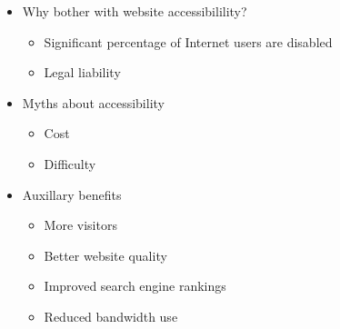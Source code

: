 \documentclass[landscape,20pt]{foils}
\newcommand{\jhead}[1]{\foilhead{\flushleft \textcolor{blue}{\large   #1}
\vspace{-1.9cm} 
\textcolor{blue}{\rule{25cm}{0.5mm}}
}}
\begin{document}
\begin{itemize}

\item Why bother with website accessibilility?

\begin{itemize}

\item Significant percentage of Internet users are disabled

\item Legal liability

\end{itemize}

\item Myths about accessibility

\begin{itemize}

\item Cost

\item Difficulty

\end{itemize}

\item Auxillary benefits

\begin{itemize}

\item More visitors

\item Better website quality

\item Improved search engine rankings

\item Reduced bandwidth use

\end{itemize}

\end{itemize}



\jhead{Accessibility}

\setcounter{page}{3}

\end{document}
